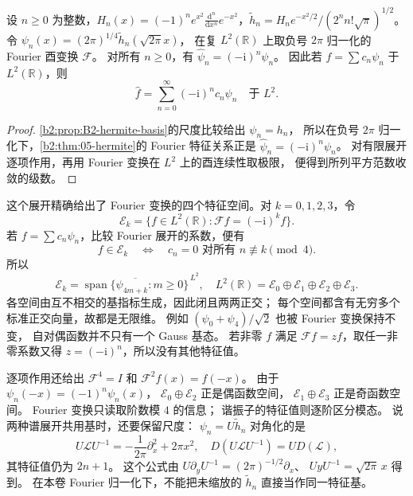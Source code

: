 \begin{theorem}
\label{b2:thm:B2-fourier-hermite}
设 \(n\geq0\) 为整数，\(H_n(x)=(-1)^ne^{x^2}\frac{\mathrm d^n}{\mathrm dx^n}e^{-x^2}\)，\(\widetilde h_n=H_ne^{-x^2/2}/(2^nn!\sqrt\pi)^{1/2}\)。
令 \(\psi_n(x)=(2\pi)^{1/4}\widetilde h_n(\sqrt{2\pi}x)\)，
在复 \(L^2(\mathbb R)\) 上取负号 \(2\pi\) 归一化的 Fourier 酉变换 \(\mathcal F\)。
对所有 \(n\geq0\)，有 \(\widehat\psi_n=(-\mathrm i)^n\psi_n\)。
因此若 \(f=\sum c_n\psi_n\) 于 \(L^2(\mathbb R)\)，则
\[
 \widehat f=\sum_{n=0}^\infty(-\mathrm i)^nc_n\psi_n
 \quad\text{于 }L^2.
\]
\end{theorem}
\begin{proof}
\cref{b2:prop:B2-hermite-basis}的尺度比较给出 \(\psi_n=h_n\)，
所以在负号 \(2\pi\) 归一化下，\cref{b2:thm:05-hermite}的 Fourier 特征关系正是
\(\widehat\psi_n=(-\mathrm i)^n\psi_n\)。
对有限展开逐项作用，再用 Fourier 变换在 \(L^2\) 上的酉连续性取极限，
便得到所列平方范数收敛的级数。
\end{proof}

这个展开精确给出了 Fourier 变换的四个特征空间。对 \(k=0,1,2,3\)，令
\[
 \mathcal E_k=\{f\in L^2(\mathbb R):
 \mathcal Ff=(-\mathrm i)^kf\}.
\]
若 \(f=\sum c_n\psi_n\)，比较 Fourier 展开的系数，便有
\[
 f\in\mathcal E_k
 \quad\Longleftrightarrow\quad
 c_n=0\text{ 对所有 }n\not\equiv k\pmod4.
\]
所以
\[
 \mathcal E_k=
 \overline{\operatorname{span}\{\psi_{4m+k}:m\geq0\}}^{\,L^2},
 \quad
 L^2(\mathbb R)=\mathcal E_0\oplus\mathcal E_1
 \oplus\mathcal E_2\oplus\mathcal E_3.
\]
各空间由互不相交的基指标生成，因此闭且两两正交；
每个空间都含有无穷多个标准正交向量，故都是无限维。
例如 \((\psi_0+\psi_4)/\sqrt2\) 也被 Fourier 变换保持不变，
自对偶函数并不只有一个 Gauss 基态。
若非零 \(f\) 满足 \(\mathcal Ff=zf\)，取任一非零系数又得
\(z=(-\mathrm i)^n\)，所以没有其他特征值。

\ProseParagraphBreak
逐项作用还给出 \(\mathcal F^4=I\) 和
\(\mathcal F^2f(x)=f(-x)\)。
由于 \(\psi_n(-x)=(-1)^n\psi_n(x)\)，
\(\mathcal E_0\oplus\mathcal E_2\) 正是偶函数空间，
\(\mathcal E_1\oplus\mathcal E_3\) 正是奇函数空间。
Fourier 变换只读取阶数模 \(4\) 的信息；
谐振子的特征值则逐阶区分模态。
说两种谱展开共用基时，还要保留尺度：
\(\psi_n=U\widetilde h_n\) 对角化的是
\[
 U\mathcal LU^{-1}
 =-\frac1{2\pi}\partial_x^2+2\pi x^2,
 \quad D(U\mathcal LU^{-1})=U D(\mathcal L),
\]
其特征值仍为 \(2n+1\)。
这个公式由 \(U\partial_yU^{-1}=(2\pi)^{-1/2}\partial_x\)、
\(UyU^{-1}=\sqrt{2\pi}\,x\) 得到。
在本卷 Fourier 归一化下，不能把未缩放的 \(\widetilde h_n\)
直接当作同一特征基。

